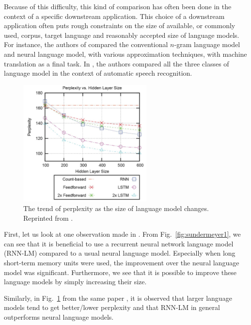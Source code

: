\documentclass{report}
\begin{document}
Because of this difficulty, this kind of comparison has often been done in the
context of a specific downstream application. This choice of a downstream
application often puts rough constraints on the size of available, or commonly
used, corpus, target language and reasonably accepted size of language models.
For instance, the authors of \cite{baltescu2014pragmatic} compared the
conventional $n$-gram language model and neural language model, with various
approximation techniques, with machine translation as a final task. In
\cite{sundermeyer2015feedforward}, the authors compared all the three classes of
language model in the context of automatic speech recognition.

\begin{figure}[ht]
    \centering
    \includegraphics[width=0.6\textwidth]{figures/sundermeyer2.png}

    \caption{
        The trend of perplexity as the size of language model changes.
        Reprinted from \cite{sundermeyer2015feedforward}.
    }
    \label{fig:sundermeyer2}
\end{figure}

First, let us look at one observation made in \cite{sundermeyer2015feedforward}.
From Fig.~\ref{fig:sundermeyer1}, we can see that it is beneficial to use a
recurrent neural network language model (RNN-LM) compared to a usual neural
language model. Especially when long short-term memory units were used, the
improvement over the neural language model was significant. Furthermore, we see
that it is possible to improve these language models by simply increasing their
size. 

Similarly, in Fig.~\ref{fig:sundermeyer2} from the same paper
\cite{sundermeyer2015feedforward}, it is observed that larger language models
tend to get better/lower perplexity and that RNN-LM in general outperforms
neural language models. 
\end{document}
